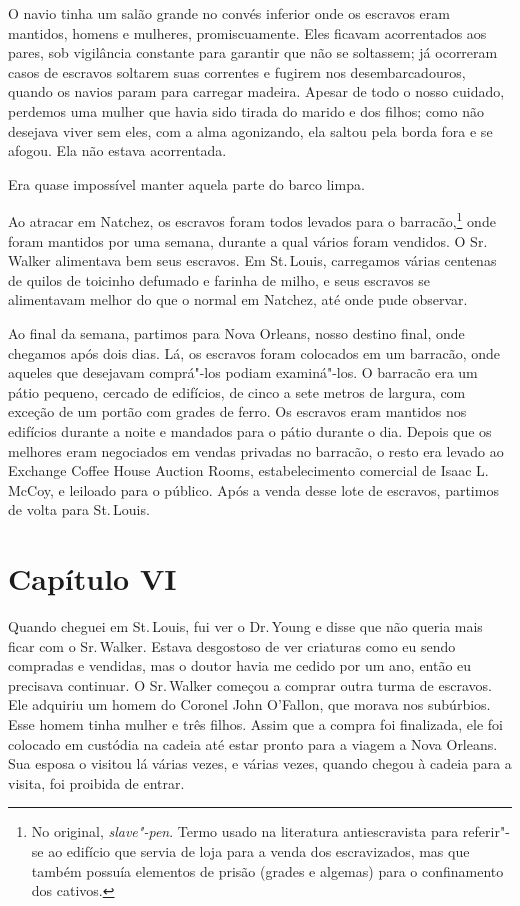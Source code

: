 O navio tinha um salão grande no convés inferior onde os escravos eram
mantidos, homens e mulheres, promiscuamente. Eles ficavam acorrentados
aos pares, sob vigilância constante para garantir que não se soltassem;
já ocorreram casos de escravos soltarem suas correntes e fugirem nos
desembarcadouros, quando os navios param para carregar madeira. Apesar
de todo o nosso cuidado, perdemos uma mulher que havia sido tirada do
marido e dos filhos; como não desejava viver sem eles, com a alma
agonizando, ela saltou pela borda fora e se afogou. Ela não estava
acorrentada.

Era quase impossível manter aquela parte do barco limpa.

Ao atracar em Natchez, os escravos foram todos levados para o
barracão,\footnote{No original, \emph{slave"-pen}. Termo usado na literatura
  antiescravista para referir"-se ao edifício que servia de loja para a
  venda dos escravizados, mas que também possuía elementos de prisão (grades
  e algemas) para o confinamento dos cativos.} onde foram mantidos por
uma semana, durante a qual vários foram vendidos. O Sr.\,Walker
alimentava bem seus escravos. Em St.\,Louis, carregamos várias centenas
de quilos de toicinho defumado e farinha de milho, e seus escravos se
alimentavam melhor do que o normal em Natchez, até onde pude observar.

Ao final da semana, partimos para Nova Orleans, nosso destino final,
onde chegamos após dois dias. Lá, os escravos foram colocados em um
barracão, onde aqueles que desejavam comprá"-los podiam examiná"-los. O
barracão era um pátio pequeno, cercado de edifícios, de cinco a sete
metros de largura, com exceção de um portão com grades de ferro. Os
escravos eram mantidos nos edifícios durante a noite e mandados para o
pátio durante o dia. Depois que os melhores eram negociados em vendas
privadas no barracão, o resto era levado ao Exchange Coffee House
Auction Rooms, estabelecimento comercial de Isaac L. McCoy, e leiloado
para o público. Após a venda desse lote de escravos, partimos de volta
para St.\,Louis.

\chapter*{Capítulo VI}

Quando cheguei em St.\,Louis, fui ver o Dr.\,Young e disse que não queria
mais ficar com o Sr.\,Walker. Estava desgostoso de ver criaturas como eu
sendo compradas e vendidas, mas o doutor havia me cedido por um ano,
então eu precisava continuar. O Sr.\,Walker começou a comprar outra turma
de escravos. Ele adquiriu um homem do Coronel John O'Fallon, que morava
nos subúrbios. Esse homem tinha mulher e três filhos. Assim que a compra
foi finalizada, ele foi colocado em custódia na cadeia até estar pronto
para a viagem a Nova Orleans. Sua esposa o visitou lá várias vezes, e
várias vezes, quando chegou à cadeia para a visita, foi proibida de
entrar.

